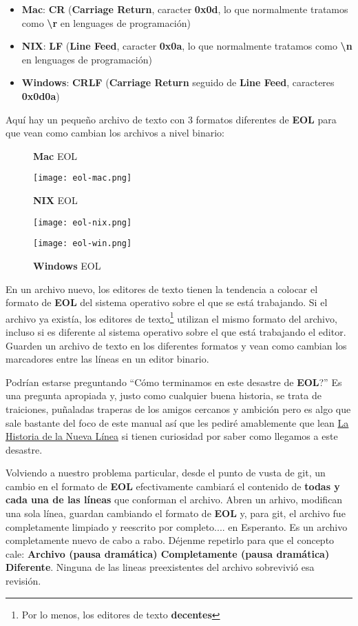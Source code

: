 \begin{itemize}
	\item {\bf Mac}: {\bf CR} ({\bf Carriage Return}, caracter {\bf 0x0d}, lo que normalmente tratamos como {\bf {\textbackslash}r}
	en lenguages de programación)
	\item {\bf NIX}: {\bf LF} ({\bf Line Feed}, caracter {\bf 0x0a}, lo que normalmente tratamos como {\bf {\textbackslash}n}
	en lenguages de programación)
	\item {\bf Windows}: {\bf CRLF} ({\bf Carriage Return} seguido de {\bf Line Feed}, caracteres {\bf 0x0d0a})
\end{itemize}

Aquí hay un pequeño archivo de texto con 3 formatos diferentes de {\bf EOL} para que vean como cambian los archivos a nivel binario:
\begin{figure}
	\centering
	\caption{{\bf Mac} EOL}
	\texttt{[image: eol-mac.png]}
	\caption{{\bf NIX} EOL}
	\texttt{[image: eol-nix.png]}
	\caption{{\bf Windows} EOL}
	\texttt{[image: eol-win.png]}
\end{figure}

En un archivo nuevo, los editores de texto tienen la tendencia a colocar el formato de {\bf EOL} del sistema operativo sobre el que se está
trabajando. Si el archivo ya existía, los editores de texto\footnote{Por lo menos, los editores de texto {\bf decentes}} utilizan
el mismo formato del archivo, incluso si es diferente al sistema operativo sobre el que está trabajando el editor. Guarden un
archivo de texto en los diferentes formatos y vean como cambian los marcadores entre las líneas en un editor binario.

Podrían estarse preguntando ``Cómo terminamos en este desastre de {\bf EOL}?'' Es una pregunta apropiada y, justo como cualquier buena
historia, se trata de traiciones, puñaladas traperas de los amigos cercanos y ambición pero es algo que sale bastante del foco de este
manual así que les pediré amablemente que lean \href{https://es.wikipedia.org/wiki/Nueva_línea#Historia}{La Historia de la Nueva Línea}
si tienen curiosidad por saber como llegamos a este desastre.

Volviendo a nuestro problema particular, desde el punto de vusta de git, un cambio en el formato de {\bf EOL} efectivamente cambiará
el contenido de {\bf todas y cada una de las líneas} que conforman el archivo. Abren un arhivo, modifican una sola línea, guardan
cambiando el formato de {\bf EOL} y, para git, el archivo fue completamente limpiado y reescrito por completo.... en Esperanto. Es
un archivo completamente nuevo de cabo a rabo. Déjenme repetirlo para que el concepto cale: {\bf Archivo (pausa dramática) Completamente
(pausa dramática) Diferente}. Ninguna de las lineas preexistentes del archivo sobrevivió esa revisión.

